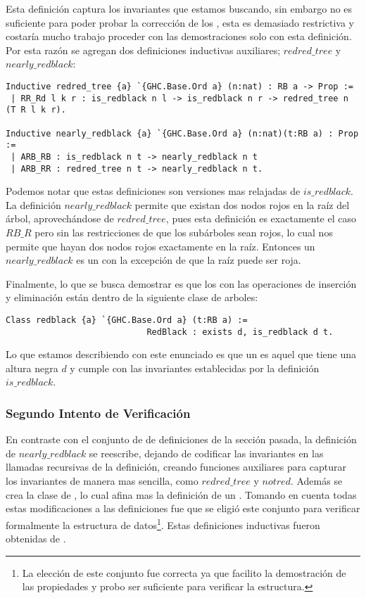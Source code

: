 Esta definici\'on captura los invariantes que estamos buscando, sin embargo no es suficiente para
poder probar la correcci\'on de los {\arns}, esta es demasiado restrictiva y costaría mucho
trabajo proceder con las demostraciones solo con esta definici\'on. Por esta razón se agregan dos
definiciones inductivas auxiliares; $redred\_tree$ y $nearly\_redblack$:

\begin{verbatim}
Inductive redred_tree {a} `{GHC.Base.Ord a} (n:nat) : RB a -> Prop :=
 | RR_Rd l k r : is_redblack n l -> is_redblack n r -> redred_tree n (T R l k r).

Inductive nearly_redblack {a} `{GHC.Base.Ord a} (n:nat)(t:RB a) : Prop :=
 | ARB_RB : is_redblack n t -> nearly_redblack n t
 | ARB_RR : redred_tree n t -> nearly_redblack n t.
\end{verbatim}

Podemos notar que estas definiciones son versiones mas relajadas de $is\_redblack$. La
definici\'on $nearly\_redblack$ permite que existan dos nodos rojos en la ra\'iz del \'arbol,
aprovech\'andose de $redred\_tree$, pues esta definici\'on es exactamente el caso $RB\_R$ pero sin
las restricciones de que los sub\'arboles sean rojos, lo cual nos permite que hayan dos nodos
rojos exactamente en la ra\'iz. Entonces un $nearly\_redblack$ es un {\arn} con la excepci\'on de
que la ra\'iz puede ser roja.

Finalmente, lo que se busca demostrar es que los {\arns} con las operaciones de inserci\'on y
eliminaci\'on están dentro de la siguiente clase de arboles:

\begin{verbatim}
Class redblack {a} `{GHC.Base.Ord a} (t:RB a) :=
                            RedBlack : exists d, is_redblack d t.
\end{verbatim}

Lo que estamos describiendo con este enunciado es que un {\arn} es aquel que tiene una altura
negra $d$ y cumple con las invariantes establecidas por la definici\'on $is\_redblack$.

\subsubsection{Segundo Intento de Verificaci\'on}
En contraste con el conjunto de de definiciones de la secci\'on pasada, la definici\'on de
$nearly\_redblack$ se reescribe, dejando de codificar las invariantes en las llamadas recursivas
de la definición, creando funciones auxiliares para capturar los invariantes de manera mas
sencilla, como $redred\_tree$ y $notred$. Además se crea la clase de {\arns}, lo cual afina mas la
definici\'on de un {\arn}. Tomando en cuenta todas estas modificaciones a las definiciones fue que
se eligió este conjunto para verificar formalmente la estructura de datos\footnote{La elecci\'on
de este conjunto fue correcta ya que facilito la demostraci\'on de las propiedades y probo ser
suficiente para verificar la estructura.}.
Estas definiciones inductivas fueron obtenidas de \cite{MSetRBT}.

